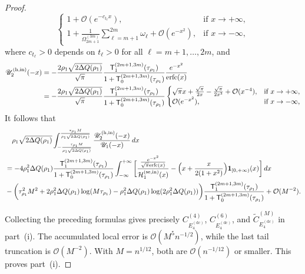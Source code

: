 \documentclass[a4paper]{article}
\newcommand{\erfc}{{\rm erfc}}
\numberwithin{equation}{section}
\begin{document}
\begin{proof}
\[\begin{cases}
1+\mathcal{O}(e^{-c_{t_{\ell}}x}),     & \mbox{if } x\to+\infty, \\
1+\frac{1}{\Omega_{2m+1}^{(3m)}}\sum_{\ell=m+1}^{2m}\omega_{\ell}+\mathcal{O}(e^{-x^2}),     & \mbox{if } x\to-\infty, 
\end{cases}
\]
where $c_{t_{\ell}}>0$ depends on $t_{\ell}>0$ for all $\ell=m+1,\dots,2m$, and 
\begin{align*}
\mathscr{U}_{2}^{(\mathrm{h,in})}(-x)
&=
-
\frac{2\rho_1\sqrt{2\Delta Q(\rho_1)}}{\sqrt{\pi}}
\frac{\mathsf{T}_{1}^{(2m+1,3m)}(\tau_{\rho_1})}{1+\mathsf{T}_{0}^{(2m+1,3m)}(\tau_{\rho_1})}\frac{e^{-x^2}}{\erfc(x)}
\\
&=
-
\frac{2\rho_1\sqrt{2\Delta Q(\rho_1)}}{\sqrt{\pi}}
\frac{\mathsf{T}_{1}^{(2m+1,3m)}(\tau_{\rho_1})}{1+\mathsf{T}_{0}^{(2m+1,3m)}(\tau_{\rho_1})}
\begin{cases}
    \sqrt{\pi}x+\frac{\sqrt{\pi}}{2x}-\frac{\sqrt{\pi}}{2x^3}+\mathcal{O}(x^{-4}), & \mbox{if } x\to+\infty, \\
    \mathcal{O}(e^{-x^2}), & \mbox{if } x\to-\infty,
\end{cases}
\end{align*}
It follows that
\begin{align*}
&\quad
\rho_1\sqrt{2\Delta Q(\rho_1)}
\int_{-\frac{\tau_{\rho_1}M}{\rho_1\sqrt{2\Delta Q(\rho_1)}}}^{\frac{\tau_{\rho_1}M}{\rho_1\sqrt{2\Delta Q(\rho_1)}}}
\frac{\mathscr{U}_{2}^{(\mathrm{h,in})}(-x)}{\mathscr{U}_{1}(-x)}\,dx
\\
&=
-4\rho_1^2\Delta Q(\rho_1)
\frac{\mathsf{T}_{1}^{(2m+1,3m)}(\tau_{\rho_1})}{1+\mathsf{T}_{0}^{(2m+1,3m)}(\tau_{\rho_1})}
\int_{-\infty}^{+\infty}
\bigg[
\frac{\frac{e^{-x^2}}{\sqrt{\pi}\erfc(x)}}{\mathcal{H}_1^{(\mathrm{se,in})}(x)}
-
\Bigl( 
x+\frac{x}{2(1+x^2)}
\Bigr)
\mathbf{1}_{[0,+\infty)}(x)
\bigg]
\,dx
\\
&
-\bigg(\tau_{\rho_1}^2M^2
+2\rho_1^2\Delta Q(\rho_1)\log( M\tau_{\rho_1})
-\rho_1^2\Delta Q(\rho_1)\log (2\rho_1^2\Delta Q(\rho_1))
\bigg)
\frac{\mathsf{T}_{1}^{(2m+1,3m)}(\tau_{\rho_1})}{1+\mathsf{T}_{0}^{(2m+1,3m)}(\tau_{\rho_1})}
+\mathcal{O}(M^{-2}).
\end{align*}

Collecting the preceding formulas gives precisely
$C_{E_4^{(\mathrm{dc})}}^{(4)}$,
$C_{E_4^{(\mathrm{dc})}}^{(6)}$, and
$\widetilde C_{E_4^{(\mathrm{dc})}}^{(M)}$ in part~(i).  The accumulated
local error is $\mathcal O(M^5n^{-1/2})$, while the last tail truncation is
$\mathcal O(M^{-2})$.  With $M=n^{1/12}$, both are
$\mathcal O(n^{-1/12})$ or smaller.  This proves part~(i).


\end{proof}
\end{document}
